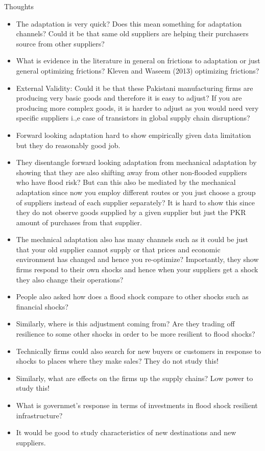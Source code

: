 \documentclass{beamer}
\begin{document}
\begin{frame}[allowframebreaks]{Thoughts}
    \label{thoughts}
\begin{itemize}
    \item    The adaptation is very quick? Does this mean something for adaptation channels? Could it be that same old suppliers are helping their purchasers source from other suppliers?
    \hyperlink{appendix}{}
    \item What is evidence in the literature in general on frictions to adaptation or just general optimizing frictions? Kleven and Waseem (2013) optimizing frictions? 
    \item  External Validity: Could it be that these Pakistani manufacturing firms are producing very basic goods and therefore it is easy to adjust? If you are producing more complex goods, it is harder to adjust as you would need very specific suppliers i.,e case of transistors in global supply chain disruptions?


 
    \item Forward looking adaptation hard to show empirically given data limitation but they do reasonably good job.


    \item They disentangle forward looking adaptation from mechanical adaptation by showing that they are also shifting away from other non-flooded suppliers who have flood risk? But can this also be mediated by the mechanical adaptation since now you employ different routes or you just choose a group of suppliers instead of each supplier separately? It is hard to show this since they do not observe goods supplied by a given supplier but just the PKR amount of purchases from that supplier. 
    \item The mechnical adaptation also has many channels such as it could be just that your old supplier cannot supply or that prices and economic environment has changed and hence you re-optimize? Importantly, they show firms respond to their own shocks and hence when your suppliers get a shock they also change their operations?
    \item People also asked how does a flood shock compare to other shocks such as financial shocks? 
    \item Similarly, where is this adjustment coming from? Are they trading off resilience to some other shocks in order to be more resilient to flood shocks? 
    \item Technically firms could also search for new buyers or customers in response to shocks to places where they make sales? They do not study this!
    \item Similarly, what are effects on the firms up the supply chains? Low power to study this!
    \item What is governmet's response in terms of investments in flood shock resilient infrastructure?
    \item It would be good to study characteristics of new destinations and new suppliers.    
    

\end{itemize}
\end{frame}
\end{document}
